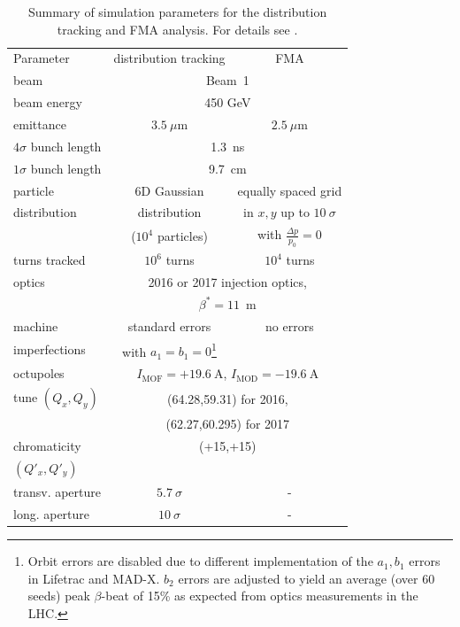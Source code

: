 \documentclass[%
 reprint,
 amsmath,amssymb,
 aps,
prstab,
]{revtex4-1}
\begin{document}
\begin{table}[h]
	\caption{\label{tab:sim_param}%
		Summary of simulation parameters for the distribution tracking and FMA analysis. For details see \cite{md_sim_hel_res_ex_fitterer,resexmd2017}.
	}
	\begin{ruledtabular}
		\begin{tabular}{lcc}
			Parameter & distribution tracking & FMA \\
			\colrule
			beam &\multicolumn{2}{c}{Beam~1} \\
			beam energy &\multicolumn{2}{c}{450 GeV} \\
			emittance & $3.5~\mu$m& $2.5~\mu$m\\
			$4\sigma$ bunch length & \multicolumn{2}{c}{1.3~ns}\\
			$1\sigma$ bunch length & \multicolumn{2}{c}{9.7~cm}\\
			particle & 6D Gaussian & equally spaced grid\\
			distribution &  distribution & in $x,y$ up to $10~\sigma$\\
			&  ($10^4$ particles) & with $\frac{\Delta p}{p_0}=0$\\
			turns tracked & $10^6$ turns & $10^4$ turns \\\hline
			optics & \multicolumn{2}{c}{2016 or 2017 injection optics,}\\
			& \multicolumn{2}{c}{$\beta^*=11$~m}\\
			machine  & standard errors & no errors \\
			imperfections &with $a_1=b_1=0$\footnote{Orbit errors are disabled due to different implementation of the $a_1,b_1$ errors in Lifetrac and MAD-X. $b_2$ errors are adjusted to yield an average (over 60 seeds) peak $\beta$-beat of 15\% as expected from optics measurements in the LHC.} &  \\
			octupoles  & \multicolumn{2}{c}{$I_{\mathrm{MOF}}=+19.6~\mathrm{A}$, $I_{\mathrm{MOD}}=-19.6~\mathrm{A}$}\\
			tune $(Q_x,Q_y)$ & \multicolumn{2}{c}{(64.28,59.31) for 2016,}\\
			& \multicolumn{2}{c}{(62.27,60.295) for 2017}\\
			chromaticity & \multicolumn{2}{c}{(+15,+15)}\\
			$(Q'_x,Q'_y)$ & & \\\hline
			transv. aperture & $5.7~\sigma$ & - \\
			long. aperture & $10~\sigma$ & - \\
		\end{tabular}
	\end{ruledtabular}
\end{table}
\end{document}
